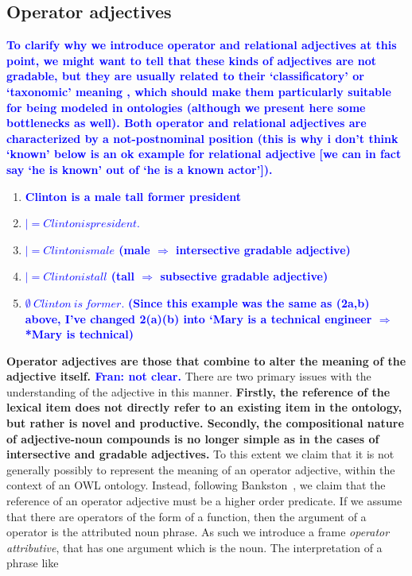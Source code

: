 \documentclass[11pt]{article}
\begin{document}
\subsection{Operator adjectives} \label{sec:operators}

\textbf{\textcolor{blue}{To clarify why we introduce operator and relational adjectives at this point, we might want to tell that these kinds of adjectives are not gradable, but they are usually related to their `classificatory' or `taxonomic' meaning \cite{mcnally2004relational}, which should make them particularly suitable for being modeled in ontologies (although we present here some bottlenecks as well). Both operator and relational adjectives are characterized by a not-postnominal position (this is why i don't think `known' below is an ok example for relational adjective [we can in fact say `he is known' out of `he is a known actor']).}}

\begin{enumerate}[resume]
\item \textbf{\textcolor{blue}{Clinton is a male tall former president}} \label{ex:clinton}
\item \textbf{\textcolor{blue}{$ |=  Clinton is president.$}}
\item \textbf{\textcolor{blue}{$ |= Clinton is male $ (male $\Rightarrow$ intersective gradable adjective)}}
\item \textbf{\textcolor{blue}{$ |= Clinton is tall $ (tall $ \Rightarrow$ subsective gradable adjective)}}
\item \textbf{\textcolor{blue}{$\emptyset  \ Clinton \ is \ former.$}} \textbf{\textcolor{blue}{(Since this example was the same as (2a,b) above, I've changed 2(a)(b) into `Mary is a technical engineer $\Rightarrow$ *Mary is technical)}}
\end{enumerate}

\textbf{Operator adjectives are those that combine to alter the meaning of the adjective itself. \textcolor{blue}{Fran: not clear.}} 
There are two primary issues with the understanding of the adjective in this manner. 
\textbf{Firstly, the reference of the lexical item does not directly refer to an existing item 
in the ontology, but rather is novel and productive. Secondly, the compositional nature 
of adjective-noun compounds is no longer simple as in the cases of intersective and gradable adjectives.}
To this extent we claim that it is not generally possibly to represent the 
meaning of an operator adjective, within the context of an OWL ontology.
Instead, following Bankston~\cite{bankston2003modeling}, we claim that
the reference of an operator adjective must be a higher order predicate.
If we assume that there are operators of the form of a function, then
the argument of a operator is the attributed noun phrase. As such
we introduce a frame \emph{operator attributive}, that has one argument
which is the noun. The interpretation of a phrase like
\end{document}
